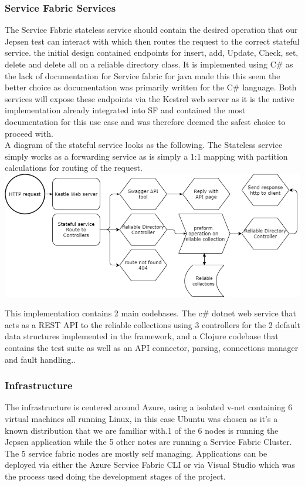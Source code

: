 \documentclass[a4paper,10pt,titlepage]{report}
\begin{document}
    \subsubsection{Service Fabric Services}

    The Service Fabric stateless service should contain the desired operation that our Jepsen test can interact with which then routes the request to the correct stateful service. the initial design contained endpoints for insert, add, Update, Check, set, delete and delete all on a reliable directory class. It is implemented using C\# as the lack of documentation for Service fabric for java made this this seem the better choice as documentation was primarily written for the C\# language. Both services will expose these endpoints via the Kestrel web server as it is the native implementation already integrated into SF and contained the most documentation for this use case and was therefore deemed the safest choice to proceed with.\\
    \vspace{5mm}
    A diagram of the stateful service looks as the following. The Stateless service simply works as a forwarding service as is simply a 1:1 mapping with partition calculations for routing of the request. \\
    \vspace{5mm}
    \includegraphics[scale=0.5]{images/Design_Stateful_service_1.0.drawio.png}

    This implementation contains 2 main codebases. The c\# dotnet web service that acts as a REST API to the reliable collections using 3 controllers for the 2 default data structures implemented in the framework, and a Clojure codebase that contains the test suite as well as an API connector, parsing, connections manager and fault handling..

    \subsubsection{Infrastructure}
    The infrastructure is centered around Azure, using a isolated v-net containing 6 virtual machines all running Linux, in this case Ubuntu was chosen as it's a known distribution that we are familiar with.1 of the 6 nodes is running the Jepsen application while the 5 other notes are running a Service Fabric Cluster.
    The 5 service fabric nodes are mostly self managing. Applications can be deployed via either the Azure Service Fabric CLI\cite{servicefabriccli} or via Visual Studio\cite{servicefabricguide} which was the process used doing the development stages of the project.
\end{document}
